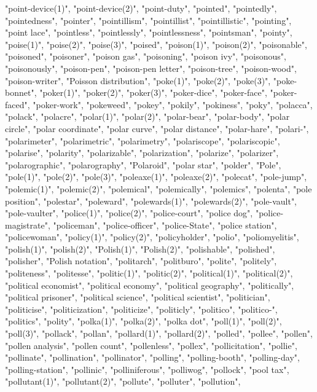 "point-device(1)",
"point-device(2)",
"point-duty",
"pointed",
"pointedly",
"pointedness",
"pointer",
"pointillism",
"pointillist",
"pointillistic",
"pointing",
"point lace",
"pointless",
"pointlessly",
"pointlessness",
"pointsman",
"pointy",
"poise(1)",
"poise(2)",
"poise(3)",
"poised",
"poison(1)",
"poison(2)",
"poisonable",
"poisoned",
"poisoner",
"poison gas",
"poisoning",
"poison ivy",
"poisonous",
"poisonously",
"poison-pen",
"poison-pen letter",
"poison-tree",
"poison-wood",
"poison-writer",
"Poisson distribution",
"poke(1)",
"poke(2)",
"poke(3)",
"poke-bonnet",
"poker(1)",
"poker(2)",
"poker(3)",
"poker-dice",
"poker-face",
"poker-faced",
"poker-work",
"pokeweed",
"pokey",
"pokily",
"pokiness",
"poky",
"polacca",
"polack",
"polacre",
"polar(1)",
"polar(2)",
"polar-bear",
"polar-body",
"polar circle",
"polar coordinate",
"polar curve",
"polar distance",
"polar-hare",
"polari-",
"polarimeter",
"polarimetric",
"polarimetry",
"polariscope",
"polariscopic",
"polarise",
"polarity",
"polarizable",
"polarization",
"polarize",
"polarizer",
"polarographic",
"polarography",
"Polaroid",
"polar star",
"polder",
"Pole",
"pole(1)",
"pole(2)",
"pole(3)",
"poleaxe(1)",
"poleaxe(2)",
"polecat",
"pole-jump",
"polemic(1)",
"polemic(2)",
"polemical",
"polemically",
"polemics",
"polenta",
"pole position",
"polestar",
"poleward",
"polewards(1)",
"polewards(2)",
"pole-vault",
"pole-vaulter",
"police(1)",
"police(2)",
"police-court",
"police dog",
"police-magistrate",
"policeman",
"police-officer",
"police-State",
"police station",
"policewoman",
"policy(1)",
"policy(2)",
"policyholder",
"polio",
"poliomyelitis",
"polish(1)",
"polish(2)",
"Polish(1)",
"Polish(2)",
"polishable",
"polished",
"polisher",
"Polish notation",
"politarch",
"politburo",
"polite",
"politely",
"politeness",
"politesse",
"politic(1)",
"politic(2)",
"political(1)",
"political(2)",
"political economist",
"political economy",
"political geography",
"politically",
"political prisoner",
"political science",
"political scientist",
"politician",
"politicise",
"politicization",
"politicize",
"politicly",
"politico",
"politico-",
"politics",
"polity",
"polka(1)",
"polka(2)",
"polka dot",
"poll(1)",
"poll(2)",
"poll(3)",
"pollack",
"pollan",
"pollard(1)",
"pollard(2)",
"polled",
"pollee",
"pollen",
"pollen analysis",
"pollen count",
"pollenless",
"pollex",
"pollicitation",
"pollie",
"pollinate",
"pollination",
"pollinator",
"polling",
"polling-booth",
"polling-day",
"polling-station",
"pollinic",
"polliniferous",
"polliwog",
"pollock",
"pool tax",
"pollutant(1)",
"pollutant(2)",
"pollute",
"polluter",
"pollution",
